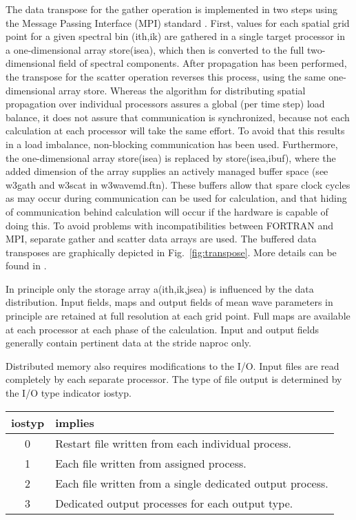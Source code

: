 The data transpose for the gather operation is implemented in two steps using
the Message Passing Interface (MPI) standard \citep[e.g.][]{bk:GLS97}. First,
values for each spatial grid point for a given spectral bin {\F(ith,ik)} are
gathered in a single target processor in a one-dimensional array {\F
  store(isea)}, which then is converted to the full two-dimensional field of
spectral components. After propagation has been performed, the transpose for
the scatter operation reverses this process, using the same one-dimensional
array {\F store}. Whereas the algorithm for distributing spatial propagation
over individual processors assures a global (per time step) load balance, it
does not assure that communication is synchronized, because not each
calculation at each processor will take the same effort. To avoid that this
results in a load imbalance, non-blocking communication has been
used. Furthermore, the one-dimensional array {\F store(isea)} is replaced by
{\F store(isea,ibuf)}, where the added dimension of the array supplies an
actively managed buffer space (see {\F w3gath} and {\F w3scat} in {\file
  w3wavemd.ftn}). These buffers allow that spare clock cycles as may occur
during communication can be used for calculation, and that hiding of
communication behind calculation will occur if the hardware is capable of
doing this. To avoid problems with incompatibilities between FORTRAN and MPI,
separate gather and scatter data arrays are used.  The buffered data
transposes are graphically depicted in Fig.~\ref{fig:transpose}. More details
can be found in \cite{tol:PACO02}.




In principle only the storage array {\F a(ith,ik,jsea)} is influenced by the
data distribution. Input fields, maps and output fields of mean wave
parameters in principle are retained at full resolution at each grid
point. Full maps are available at each processor at each phase of the
calculation. Input and output fields generally contain pertinent data at the
stride {\F naproc} only.

Distributed memory also requires modifications to the I/O. Input files are
read completely by each separate processor. The type of file output is
determined by the I/O type indicator {\F iostyp}.

\begin{center} \begin{tabular}{cl}
{\F iostyp} & implies \\ \hline
  0 & Restart file written from each individual process. \\
  1 & Each file written from assigned process. \\
  2 & Each file written from a single dedicated output process. \\
  3 & Dedicated output processes for each output type.
\end{tabular} \end{center}


